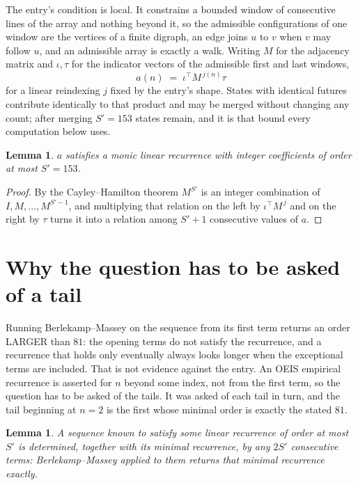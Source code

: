 \documentclass[11pt,a4paper]{article}
\theoremstyle{plain}
\newtheorem{lemma}[theorem]{Lemma}
\theoremstyle{definition}
\begin{document}
The entry's condition is local. It constrains a bounded window of consecutive lines of the
array and nothing beyond it, so the admissible configurations of one window are the vertices of
a finite digraph, an edge joins $u$ to $v$ when $v$ may follow $u$, and an admissible array is
exactly a walk. Writing $M$ for the adjacency matrix and $\iota,\tau$ for the indicator vectors
of the admissible first and last windows,
\[
a(n)\;=\;\iota^{\!\top}M^{\,j(n)}\tau
\]
for a linear reindexing $j$ fixed by the entry's shape. States with identical futures
contribute identically to that product and may be merged without changing any count; after
merging $S'=153$ states remain, and it is that bound every computation below uses.

\begin{lemma}\label{lem:cf}
$a$ satisfies a monic linear recurrence with integer coefficients of order at most $S'=153$.
\end{lemma}

\begin{proof}
By the Cayley--Hamilton theorem $M^{S'}$ is an integer combination of $I,M,\dots,M^{S'-1}$,
and multiplying that relation on the left by $\iota^{\!\top}M^{\,j}$ and on the right by
$\tau$ turns it into a relation among $S'+1$ consecutive values of $a$.
\end{proof}

\section{Why the question has to be asked of a tail}

Running Berlekamp--Massey on the sequence from its first term returns an order LARGER than $81$: the opening terms do not satisfy the recurrence, and a recurrence that holds only eventually always looks longer when the exceptional terms are included. That is not evidence against the entry. An OEIS empirical recurrence is asserted for $n$ beyond some index, not from the first term, so the question has to be asked of the tails. It was asked of each tail in turn, and the tail beginning at $n=2$ is the first whose minimal order is exactly the stated $81$.

\begin{lemma}\label{lem:bm}
A sequence known to satisfy some linear recurrence of order at most $S'$ is determined,
together with its minimal recurrence, by any $2S'$ consecutive terms: Berlekamp--Massey applied
to them returns that minimal recurrence exactly.
\end{lemma}
\end{document}
